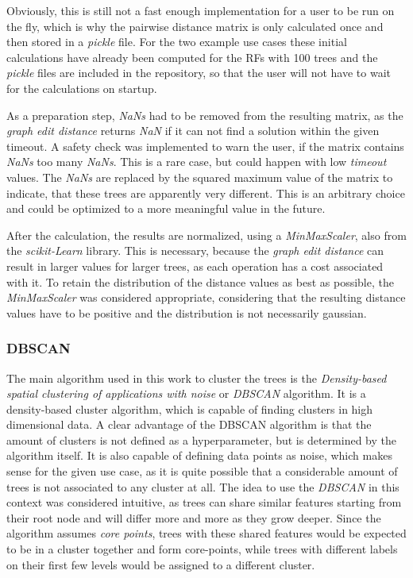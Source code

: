 \documentclass[a4paper, 12pt]{article}
\begin{document}
Obviously, this is still not a fast enough implementation for a user to be run on the fly, which
is why the pairwise distance matrix is only calculated once and then stored in a \textit{pickle}
file. For the two example use cases these initial calculations have already been computed for the
RFs with 100 trees and the \textit{pickle} files are included in the repository, so that the user
will not have to wait for the calculations on startup. \par

As a preparation step, \textit{NaNs} had to be removed from the resulting matrix, as the
\textit{graph edit distance} returns \textit{NaN} if it can not find a solution within the given
timeout. A safety check was implemented to warn the user, if the matrix contains \textit{NaNs}
too many \textit{NaNs}. This is a rare case, but could happen with low \textit{timeout} values.
The \textit{NaNs} are replaced by the squared maximum value of the matrix to indicate, that these
trees are apparently very different. This is an arbitrary choice and could be optimized to a
more meaningful value in the future. \par

After the calculation, the results are normalized, using a \textit{MinMaxScaler}, also from the
\textit{scikit-Learn} library. This is necessary, because the \textit{graph edit distance} can
result in larger values for larger trees, as each operation has a cost associated with it. To
retain the distribution of the distance values as best as possible, the \textit{MinMaxScaler}
was considered appropriate, considering that the resulting distance values have to be positive
and the distribution is not necessarily gaussian.

\subsubsection{DBSCAN}
The main algorithm used in this work to cluster the trees is the \textit{Density-based spatial
    clustering of applications with noise} or \textit{DBSCAN} algorithm. It is
a density-based cluster algorithm, which is capable of finding clusters in high dimensional data.
A clear advantage of the DBSCAN algorithm is that the amount of clusters is not defined as a
hyperparameter, but is determined by the algorithm itself. It is also capable of defining data
points as noise, which makes sense for the given use case, as it is quite possible that a
considerable amount of trees is not associated to any cluster at all. The idea to use the
\textit{DBSCAN} in this context was considered intuitive, as trees can share similar features
starting from their root node and will differ more and more as they grow deeper. Since the
algorithm assumes \textit{core points}, trees with these shared features would be expected to
be in a cluster together and form core-points, while trees with different labels on their first
few levels would be assigned to a different cluster. \par
\end{document}
